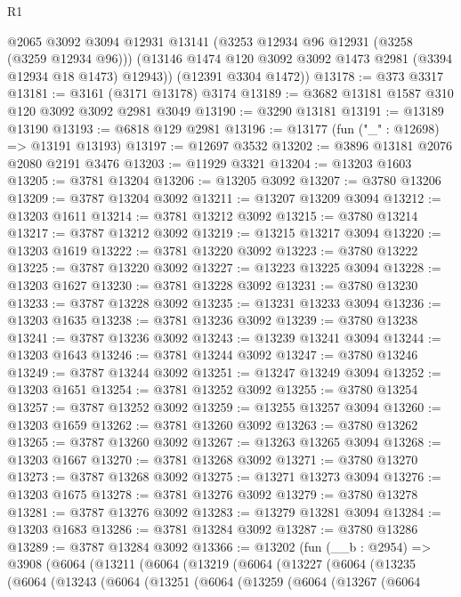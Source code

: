 \begin{lexlean}{R1}
\begin{coremodule}
        @2065
        @3092
        @3094
        @12931
        @13141
        (@3253 @12934 @96 @12931 (@3258 (@3259 @12934 @96)))
        (@13146 @1474 @120 @3092 @3092 @1473 @2981 (@3394 @12934 @18 @1473) @12943))
      (@12391 @3304 @1472))
@13178 := @373 @3317
@13181 := @3161 (@3171 @13178) @3174
@13189 := @3682 @13181 @1587 @310 @120 @3092 @3092 @2981 @3049
@13190 := @3290 @13181
@13191 := @13189 @13190
@13193 := @6818 @129 @2981
@13196 := @13177 (fun ("_" : @12698) => @13191 @13193)
@13197 := @12697 @3532
@13202 := @3896 @13181 @2076 @2080 @2191 @3476
@13203 := @11929 @3321
@13204 := @13203 @1603
@13205 := @3781 @13204
@13206 := @13205 @3092
@13207 := @3780 @13206
@13209 := @3787 @13204 @3092
@13211 := @13207 @13209 @3094
@13212 := @13203 @1611
@13214 := @3781 @13212 @3092
@13215 := @3780 @13214
@13217 := @3787 @13212 @3092
@13219 := @13215 @13217 @3094
@13220 := @13203 @1619
@13222 := @3781 @13220 @3092
@13223 := @3780 @13222
@13225 := @3787 @13220 @3092
@13227 := @13223 @13225 @3094
@13228 := @13203 @1627
@13230 := @3781 @13228 @3092
@13231 := @3780 @13230
@13233 := @3787 @13228 @3092
@13235 := @13231 @13233 @3094
@13236 := @13203 @1635
@13238 := @3781 @13236 @3092
@13239 := @3780 @13238
@13241 := @3787 @13236 @3092
@13243 := @13239 @13241 @3094
@13244 := @13203 @1643
@13246 := @3781 @13244 @3092
@13247 := @3780 @13246
@13249 := @3787 @13244 @3092
@13251 := @13247 @13249 @3094
@13252 := @13203 @1651
@13254 := @3781 @13252 @3092
@13255 := @3780 @13254
@13257 := @3787 @13252 @3092
@13259 := @13255 @13257 @3094
@13260 := @13203 @1659
@13262 := @3781 @13260 @3092
@13263 := @3780 @13262
@13265 := @3787 @13260 @3092
@13267 := @13263 @13265 @3094
@13268 := @13203 @1667
@13270 := @3781 @13268 @3092
@13271 := @3780 @13270
@13273 := @3787 @13268 @3092
@13275 := @13271 @13273 @3094
@13276 := @13203 @1675
@13278 := @3781 @13276 @3092
@13279 := @3780 @13278
@13281 := @3787 @13276 @3092
@13283 := @13279 @13281 @3094
@13284 := @13203 @1683
@13286 := @3781 @13284 @3092
@13287 := @3780 @13286
@13289 := @3787 @13284 @3092
@13366 := @13202
    (fun (__b : @2954) =>
    @3908
      (@6064
        (@13211
          (@6064
            (@13219
              (@6064
                (@13227
                  (@6064
                    (@13235
                      (@6064
                        (@13243
                          (@6064
                            (@13251
                              (@6064
                                (@13259
                                  (@6064
                                    (@13267
                                      (@6064

\end{coremodule}
\end{lexlean}
